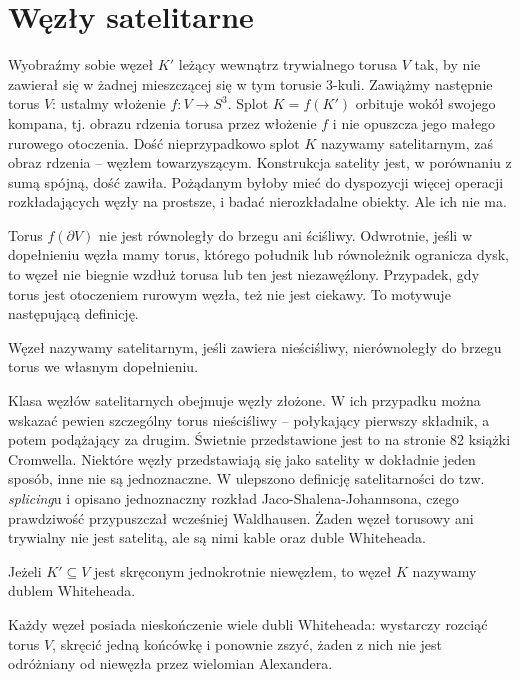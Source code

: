 \section{Węzły satelitarne} %
\label{sec:satellite}
Wyobraźmy sobie węzeł $K'$ leżący wewnątrz trywialnego torusa $V$ tak, by nie zawierał się w żadnej mieszczącej się w tym torusie 3-kuli.
Zawiążmy następnie torus $V$: ustalmy włożenie $f \colon V \to S^3$.
Splot $K = f(K')$ orbituje wokół swojego kompana, tj. obrazu rdzenia torusa przez włożenie $f$ i nie opuszcza jego małego rurowego otoczenia.
Dość nieprzypadkowo splot $K$ nazywamy satelitarnym, zaś obraz rdzenia -- węzłem towarzyszącym.
Konstrukcja satelity jest, w porównaniu z sumą spójną, dość zawiła.
Pożądanym byłoby mieć do dyspozycji więcej operacji rozkładających węzły na prostsze, i badać nierozkładalne obiekty.
Ale ich nie ma.

Torus $f(\partial V)$ nie jest równoległy do brzegu ani ściśliwy.
Odwrotnie, jeśli w dopełnieniu węzła mamy torus, którego południk lub równoleżnik ogranicza dysk, to węzeł nie biegnie wzdłuż torusa lub ten jest niezawęźlony.
Przypadek, gdy torus jest otoczeniem rurowym węzła, też nie jest ciekawy.
To motywuje następującą definicję.

\begin{definition}
	Węzeł nazywamy satelitarnym, jeśli zawiera nieściśliwy, nierównoległy do brzegu torus we własnym dopełnieniu.
\end{definition}

Klasa węzłów satelitarnych obejmuje węzły złożone.
W ich przypadku można wskazać pewien szczególny torus nieściśliwy -- połykający pierwszy składnik, a potem podążający za drugim.
Świetnie przedstawione jest to na stronie 82 książki \cite{cromwell04} Cromwella.
Niektóre węzły przedstawiają się jako satelity w dokładnie jeden sposób, inne nie są jednoznaczne.
W \cite{jaco79} ulepszono definicję satelitarności do tzw. \emph{splicing}u i opisano jednoznaczny rozkład Jaco-Shalena-Johannsona, czego prawdziwość przypuszczał wcześniej Waldhausen.
Żaden węzeł torusowy ani trywialny nie jest satelitą, ale są nimi kable oraz duble Whiteheada.

\begin{definition}
	Jeżeli $K' \subseteq V$ jest skręconym jednokrotnie niewęzłem, to węzeł $K$ nazywamy dublem Whiteheada.
\end{definition}

Każdy węzeł posiada nieskończenie wiele dubli Whiteheada: wystarczy rozciąć torus $V$, skręcić jedną końcówkę i ponownie zszyć, żaden z nich nie jest odróżniany od niewęzła przez wielomian Alexandera.

